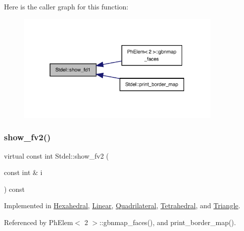 Here is the caller graph for this function\+:
\nopagebreak
\begin{figure}[H]
\begin{center}
\leavevmode
\includegraphics[width=283pt]{classStdel_af4a394fae421489159f40ddcb736353b_icgraph}
\end{center}
\end{figure}
\mbox{\label{classStdel_a67f16a65f02fc8a5aa10274539bd1ad8}} 
\subsubsection{\texorpdfstring{show\+\_\+fv2()}{show\_fv2()}}
{\footnotesize\ttfamily virtual const int Stdel\+::show\+\_\+fv2 (\begin{DoxyParamCaption}\item[{const int \&}]{i }\end{DoxyParamCaption}) const\hspace{0.3cm}{\ttfamily [pure virtual]}}



Implemented in \hyperlink{classHexahedral_a5eadccb0e54a1852c01a1f90a3a2bfd9}{Hexahedral}, \hyperlink{classLinear_aa0fe8dfc164afda4e30551322de7984e}{Linear}, \hyperlink{classQuadrilateral_a32796d1fcdbc5d7372c9b5c08c7d5a61}{Quadrilateral}, \hyperlink{classTetrahedral_ab77ef395ad60c4efde2e2f5a3f7c8fcf}{Tetrahedral}, and \hyperlink{classTriangle_a89169103df31e2cbe4383617363e48de}{Triangle}.



Referenced by Ph\+Elem$<$ 2 $>$\+::gbnmap\+\_\+faces(), and print\+\_\+border\+\_\+map().

